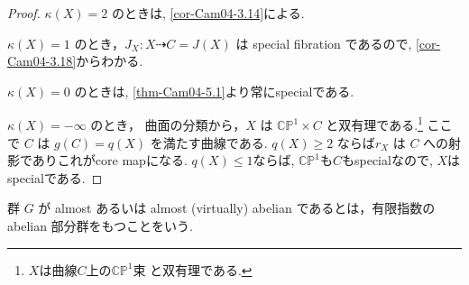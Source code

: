 \documentclass[dvipdfmx,a4paper,11pt]{article} %
\theoremstyle{definition}
\theoremstyle{remark}
\numberwithin{equation}{section}
\newcommand{\C}{\mathbb{C}}
\begin{document}
\begin{proof}
\(\kappa(X)=2\) のときは, \ref{cor-Cam04-3.14}による. 

\(\kappa(X)=1\) のとき，\(J_X : X \dashrightarrow C=J(X)\) は special  fibration であるので, \ref{cor-Cam04-3.18}からわかる. 

\(\kappa(X)=0\) のときは, \ref{thm-Cam04-5.1}より常にspecialである.

\(\kappa(X)=-\infty\) のとき， 曲面の分類から，\(X\) は \( \C\mathbb{P}^1\times C\) と双有理である.\footnote{$X$は曲線$C$上の$\C\mathbb{P}^1$束 と双有理である.} ここで \(C\) は \(g(C)=q(X)\) を満たす曲線である. 
 \(q(X)\ge 2\) ならば\(r_X\) は \(C\) への射影でありこれがcore mapになる. 
$q(X)\leq 1$ならば, $\C\mathbb{P}^1$も$ C$もspecialなので, $X$はspecialである. 
\end{proof}

群 \(G\) が almost あるいは almost (virtually) abelian であるとは，有限指数の abelian 部分群をもつことをいう.
\end{document}
